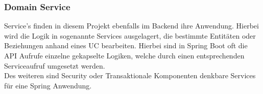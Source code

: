 			\subsubsection{Domain Service}
			Service's finden in diesem Projekt ebenfalls im Backend ihre Anwendung. Hierbei wird die Logik in sogenannte Services ausgelagert, die bestimmte Entitäten oder Beziehungen anhand eines \ac{UC} bearbeiten. Hierbei sind in Spring Boot oft die \ac{API} Aufrufe einzelne gekapselte Logiken, welche durch einen entsprechenden Serviceaufruf umgesetzt werden. \\ 
			Des weiteren sind Security oder Transaktionale Komponenten denkbare Services für eine Spring Anwendung.